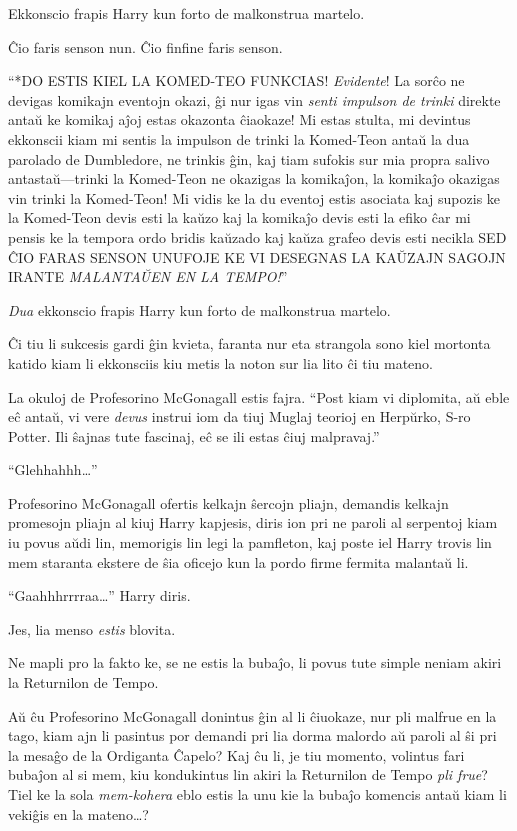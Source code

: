 Ekkonscio frapis Harry kun forto de malkonstrua martelo.

Ĉio faris senson nun. Ĉio finfine faris senson.

``*DO ESTIS KIEL LA KOMED-TEO FUNKCIAS! \emph{Evidente}! La sorĉo ne
devigas komikajn eventojn okazi, ĝi nur igas vin \emph{senti impulson
de trinki} direkte antaŭ ke komikaj aĵoj estas okazonta ĉiaokaze! Mi
estas stulta, mi devintus ekkonscii kiam mi sentis la impulson de trinki
la Komed-Teon antaŭ la dua parolado de Dumbledore, ne trinkis ĝin, kaj
tiam sufokis sur mia propra salivo antastaŭ—trinki la Komed-Teon ne
okazigas la komikaĵon, la komikaĵo okazigas vin trinki la Komed-Teon!
Mi vidis ke la du eventoj estis asociata kaj supozis ke la Komed-Teon
devis esti la kaŭzo kaj la komikaĵo devis esti la efiko ĉar mi pensis
ke la tempora ordo bridis kaŭzado kaj kaŭza grafeo devis esti necikla
SED ĈIO FARAS SENSON UNUFOJE KE VI DESEGNAS LA KAŬZAJN SAGOJN IRANTE
\emph{MALANTAŬEN EN LA TEMPO!}'' 

\emph{Dua} ekkonscio frapis Harry kun forto de malkonstrua martelo.

Ĉi tiu li sukcesis gardi ĝin kvieta, faranta nur eta strangola sono
kiel mortonta katido kiam li ekkonsciis kiu metis la noton sur lia
lito ĉi tiu mateno.

La okuloj de Profesorino McGonagall estis fajra. ``Post kiam vi
diplomita, aŭ eble eĉ antaŭ, vi vere \emph{devus} instrui iom da tiuj
Muglaj teorioj en Herpŭrko, S-ro Potter. Ili ŝajnas tute fascinaj, eĉ
se ili estas ĉiuj malpravaj.''

``Glehhahhh\ldots''

Profesorino McGonagall ofertis kelkajn ŝercojn pliajn, demandis
kelkajn promesojn pliajn al kiuj Harry kapjesis, diris ion pri ne
paroli al serpentoj kiam iu povus aŭdi lin, memorigis lin legi la
pamfleton, kaj poste iel Harry trovis lin mem staranta ekstere de ŝia
oficejo kun la pordo firme fermita malantaŭ li.

``Gaahhhrrrraa\ldots'' Harry diris.

Jes, lia menso \emph{estis} blovita.

Ne mapli pro la fakto ke, se ne estis la bubaĵo, li povus tute simple
neniam akiri la Returnilon de Tempo.

Aŭ ĉu Profesorino McGonagall donintus ĝin al li ĉiuokaze, nur pli
malfrue en la tago, kiam ajn li pasintus por demandi pri lia dorma
malordo aŭ paroli al ŝi pri la mesaĝo de la Ordiganta Ĉapelo? Kaj ĉu li,
je tiu momento, volintus fari bubaĵon al si mem, kiu kondukintus lin
akiri la Returnilon de Tempo \emph{pli frue}? Tiel ke la sola
\emph{mem-kohera} eblo estis la unu kie la bubaĵo komencis antaŭ kiam
li vekiĝis en la mateno\ldots?

